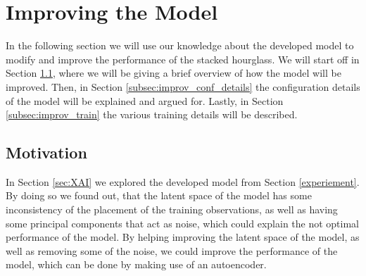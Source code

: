 \documentclass[./main.tex]{subfiles}
\begin{document}
\section{Improving the Model}\label{sec:improving}
In the following section we will use our knowledge about the developed model to modify and improve the performance of the stacked hourglass. We will start off in Section \ref{subsec:improv_motivation}, where we will be giving a brief overview of how the model will be improved. Then, in Section \ref{subsec:improv_conf_details} the configuration details of the model will be explained and argued for. Lastly, in Section \ref{subsec:improv_train} the various training details will be described.

\subsection{Motivation}\label{subsec:improv_motivation}
In Section \ref{sec:XAI} we explored the developed model from Section \ref{experiement}. By doing so we found out, that the latent space of the model has some inconsistency of the placement of the training observations, as well as having some principal components that act as noise, which could explain the not optimal performance of the model. By helping improving the latent space of the model, as well as removing some of the noise, we could improve the performance of the model, which can be done by making use of an autoencoder.
\end{document}
